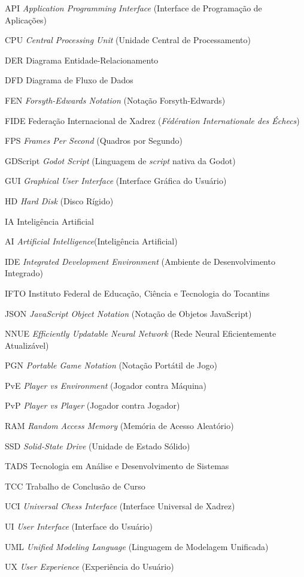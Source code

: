 \begin{siglas}
	\item[API] \textit{Application Programming Interface} (Interface de Programação de Aplicações)
	\item[CPU] \textit{Central Processing Unit} (Unidade Central de Processamento)
	\item[DER] Diagrama Entidade-Relacionamento
	\item[DFD] Diagrama de Fluxo de Dados
	\item[FEN] \textit{Forsyth-Edwards Notation} (Notação Forsyth-Edwards)
	\item[FIDE] Federação Internacional de Xadrez (\textit{Fédération Internationale des Échecs})
	\item[FPS] \textit{Frames Per Second} (Quadros por Segundo)
	\item[GDScript] \textit{Godot Script} (Linguagem de \textit{script} nativa da Godot)
	\item[GUI] \textit{Graphical User Interface} (Interface Gráfica do Usuário)
	\item[HD] \textit{Hard Disk} (Disco Rígido)
	\item[IA] Inteligência Artificial
	\item[AI] \textit{Artificial Intelligence}(Inteligência Artificial)
	\item[IDE] \textit{Integrated Development Environment} (Ambiente de Desenvolvimento Integrado)
	\item[IFTO] Instituto Federal de Educação, Ciência e Tecnologia do Tocantins
	\item[JSON] \textit{JavaScript Object Notation} (Notação de Objetos JavaScript)
	\item[NNUE] \textit{Efficiently Updatable Neural Network} (Rede Neural Eficientemente Atualizável)
	\item[PGN] \textit{Portable Game Notation} (Notação Portátil de Jogo)
	\item[PvE] \textit{Player vs Environment} (Jogador contra Máquina)
	\item[PvP] \textit{Player vs Player} (Jogador contra Jogador)
	\item[RAM] \textit{Random Access Memory} (Memória de Acesso Aleatório)
	\item[SSD] \textit{Solid-State Drive} (Unidade de Estado Sólido)
	\item[TADS] Tecnologia em Análise e Desenvolvimento de Sistemas
	\item[TCC] Trabalho de Conclusão de Curso
	\item[UCI] \textit{Universal Chess Interface} (Interface Universal de Xadrez)
	\item[UI] \textit{User Interface} (Interface do Usuário)
	\item[UML] \textit{Unified Modeling Language} (Linguagem de Modelagem Unificada)
	\item[UX] \textit{User Experience} (Experiência do Usuário)
\end{siglas}